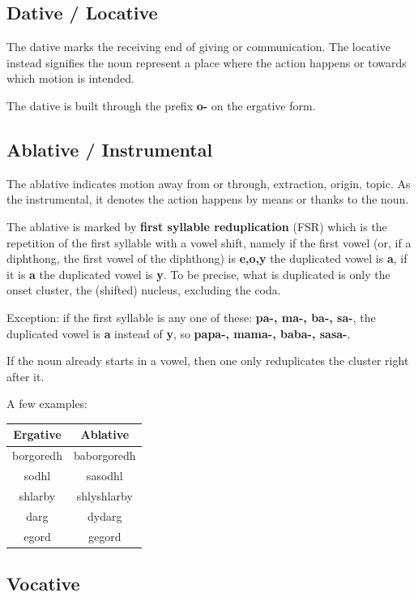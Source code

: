\documentclass[10pt,oneside]{memoir}
\begin{document}
\begin{multicols}{2}
\subsection{Dative / Locative}

The dative marks the receiving end of giving or communication. The locative instead signifies the noun represent a place where the action happens or towards which motion is intended.

The dative is built through the prefix \textbf{o-} on the ergative form.

\subsection{Ablative / Instrumental}

The ablative indicates motion away from or through, extraction, origin, topic. As the instrumental, it denotes the action happens by means or thanks to the noun.

The ablative is marked by \textbf{first syllable reduplication} (FSR) which is the repetition of the first syllable with a vowel shift, namely if the first vowel (or, if a diphthong, the first vowel of the diphthong) is \textbf{e,o,y} the duplicated vowel is \textbf{a}, if it is \textbf{a} the duplicated vowel is \textbf{y}. To be precise, what is duplicated is only the onset cluster, the (shifted) nucleus, excluding the coda.

Exception: if the first syllable is any one of these: \textbf{pa-, ma-, ba-, sa-}, the duplicated vowel is \textbf{a} instead of \textbf{y}, so \textbf{papa-, mama-, baba-, sasa-}.

If the noun already starts in a vowel, then one only reduplicates the cluster right after it.

A few examples:

\begin{center}
    \begin{tabular}[]{c | c}
        Ergative & Ablative\\
        \hline
        borgoredh & baborgoredh\\
        sodhl & sasodhl\\
        shlarby & shlyshlarby\\
        darg & dydarg \\
        egord & gegord
    \end{tabular}
\end{center}


\subsection{Vocative}


\end{multicols}
\end{document}

